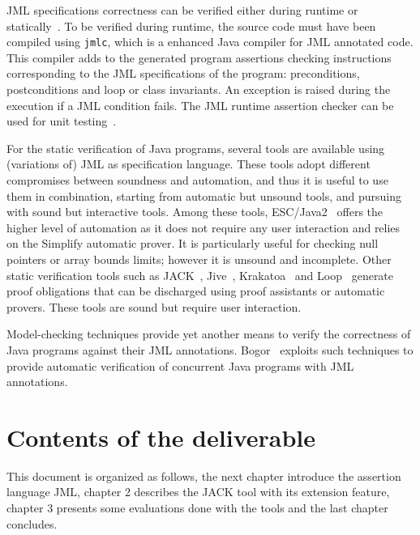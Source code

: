 JML specifications correctness can be verified either during runtime
or statically~\cite{jml:sttt}. To be verified during runtime, the
source code must have been compiled using \texttt{jmlc}, which is a
enhanced Java compiler for JML annotated code. This compiler adds to
the generated program assertions checking instructions corresponding
to the JML specifications of the program: preconditions, postconditions 
and loop or class invariants. An exception is raised during the execution 
if a JML condition fails. The JML runtime assertion checker can be used
for unit testing~\cite{CL02:ecoop}.


For the static verification of Java programs, several tools are
available using (variations of) JML as specification language. These
tools adopt different compromises between soundness and automation,
and thus it is useful to use them in combination, starting from
automatic but unsound tools, and pursuing with sound but interactive
tools.  Among these tools, ESC/Java2~\cite{CK04:cassis} offers the higher
level of automation as it does not require any user interaction and
relies on the Simplify automatic prover. It is particularly useful for
checking null pointers or array bounds limits; however it is unsound
and incomplete. Other static verification tools such as
JACK~\cite{BRL03:fme}, Jive~\cite{jive}, Krakatoa~\cite{MPU03:jlap}
and Loop~\cite{vdBJ01:tacas} generate proof obligations that can be
discharged using proof assistants or automatic provers. These tools
are sound but require user interaction.

Model-checking techniques provide yet another means to verify the
correctness of Java programs against their JML
annotations. Bogor~\cite{robby+04:tacas} exploits such techniques to 
provide automatic verification of concurrent Java programs
with JML annotations.



\section{Contents of the deliverable}
This document is organized as follows, the next chapter introduce the
assertion language JML, chapter 2 describes the JACK tool with its
extension feature, chapter 3 presents some evaluations done with the
tools and the last chapter concludes.
